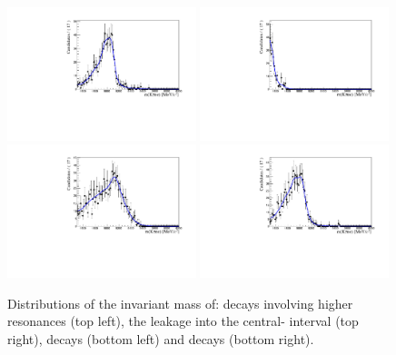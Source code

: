 \begin{figure}[t!]
\centering
\includegraphics[width=0.49\textwidth]{RKst/figs/Fit/fit_EE/rooKeysModel_bkg_partReco_KstEE_low_L0E__for_B0_PV_M.pdf}
\includegraphics[width=0.49\textwidth]{RKst/figs/Fit/fit_EE/rooKeysModel_bkg_leakJPs_KstEE_central_L0E__for_B0_PV_M.pdf}
\includegraphics[width=0.49\textwidth]{RKst/figs/Fit/fit_EE/rooKeysModel_bkg_Lb2pKJPs_KstJPsEE_L0E__for_B0_PV_M.pdf}
\includegraphics[width=0.49\textwidth]{RKst/figs/Fit/fit_EE/rooKeysModel_bkg_partReco_KstGEE_L0E__for_B0_PV_M.pdf}
\caption{Distributions of the \mKpiee invariant mass of: decays involving
higher \Kstarz resonances (top left), the \jpsi leakage into the central-\qsq 
interval (top right), \Lb decays (bottom left) and \BdToKstGee decays (bottom right).}
\label{fig:misreco}


\end{figure}
